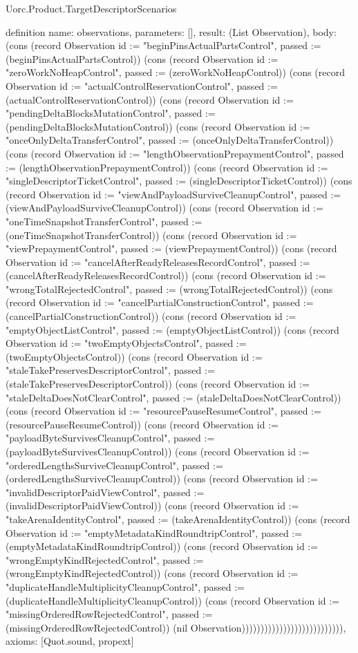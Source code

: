 \begin{lexlean}{Uorc.Product.TargetDescriptorScenarios}
\begin{semanticmodule}
definition{
  name: observations,
  parameters: [],
  result: (List Observation),
  body: (cons (record Observation {id := "beginPinsActualPartsControl", passed := (beginPinsActualPartsControl)}) (cons (record Observation {id := "zeroWorkNoHeapControl", passed := (zeroWorkNoHeapControl)}) (cons (record Observation {id := "actualControlReservationControl", passed := (actualControlReservationControl)}) (cons (record Observation {id := "pendingDeltaBlocksMutationControl", passed := (pendingDeltaBlocksMutationControl)}) (cons (record Observation {id := "onceOnlyDeltaTransferControl", passed := (onceOnlyDeltaTransferControl)}) (cons (record Observation {id := "lengthObservationPrepaymentControl", passed := (lengthObservationPrepaymentControl)}) (cons (record Observation {id := "singleDescriptorTicketControl", passed := (singleDescriptorTicketControl)}) (cons (record Observation {id := "viewAndPayloadSurviveCleanupControl", passed := (viewAndPayloadSurviveCleanupControl)}) (cons (record Observation {id := "oneTimeSnapshotTransferControl", passed := (oneTimeSnapshotTransferControl)}) (cons (record Observation {id := "viewPrepaymentControl", passed := (viewPrepaymentControl)}) (cons (record Observation {id := "cancelAfterReadyReleasesRecordControl", passed := (cancelAfterReadyReleasesRecordControl)}) (cons (record Observation {id := "wrongTotalRejectedControl", passed := (wrongTotalRejectedControl)}) (cons (record Observation {id := "cancelPartialConstructionControl", passed := (cancelPartialConstructionControl)}) (cons (record Observation {id := "emptyObjectListControl", passed := (emptyObjectListControl)}) (cons (record Observation {id := "twoEmptyObjectsControl", passed := (twoEmptyObjectsControl)}) (cons (record Observation {id := "staleTakePreservesDescriptorControl", passed := (staleTakePreservesDescriptorControl)}) (cons (record Observation {id := "staleDeltaDoesNotClearControl", passed := (staleDeltaDoesNotClearControl)}) (cons (record Observation {id := "resourcePauseResumeControl", passed := (resourcePauseResumeControl)}) (cons (record Observation {id := "payloadByteSurvivesCleanupControl", passed := (payloadByteSurvivesCleanupControl)}) (cons (record Observation {id := "orderedLengthsSurviveCleanupControl", passed := (orderedLengthsSurviveCleanupControl)}) (cons (record Observation {id := "invalidDescriptorPaidViewControl", passed := (invalidDescriptorPaidViewControl)}) (cons (record Observation {id := "takeArenaIdentityControl", passed := (takeArenaIdentityControl)}) (cons (record Observation {id := "emptyMetadataKindRoundtripControl", passed := (emptyMetadataKindRoundtripControl)}) (cons (record Observation {id := "wrongEmptyKindRejectedControl", passed := (wrongEmptyKindRejectedControl)}) (cons (record Observation {id := "duplicateHandleMultiplicityCleanupControl", passed := (duplicateHandleMultiplicityCleanupControl)}) (cons (record Observation {id := "missingOrderedRowRejectedControl", passed := (missingOrderedRowRejectedControl)}) (nil Observation))))))))))))))))))))))))))),
  axioms: [Quot.sound, propext]
}
\end{semanticmodule}
\end{lexlean}
